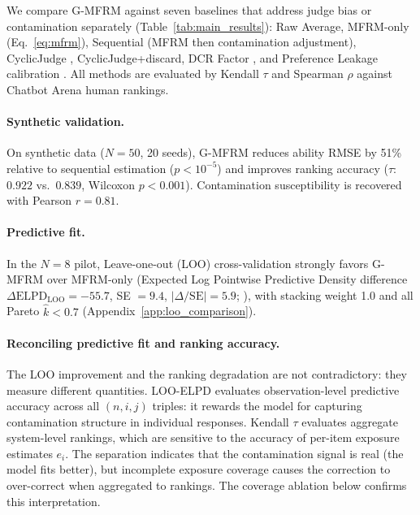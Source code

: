 We compare G-MFRM against seven baselines that address judge bias or contamination separately (Table~\ref{tab:main_results}): Raw Average, MFRM-only (Eq.~\ref{eq:mfrm}), Sequential (MFRM then contamination adjustment), CyclicJudge \citep{cyclicjudge2026}, CyclicJudge+discard, DCR Factor \citep{dcr2025}, and Preference Leakage calibration \citep{preference_leakage2026}. All methods are evaluated by Kendall $\tau$ and Spearman $\rho$ against Chatbot Arena human rankings.

\paragraph{Synthetic validation.} On synthetic data ($N = 50$, 20 seeds), G-MFRM reduces ability RMSE by 51\% relative to sequential estimation ($p < 10^{-5}$) and improves ranking accuracy ($\tau$: $0.922$ vs.\ $0.839$, Wilcoxon $p < 0.001$). Contamination susceptibility is recovered with Pearson $r = 0.81$.

\paragraph{Predictive fit.} In the $N = 8$ pilot, Leave-one-out (LOO) cross-validation strongly favors G-MFRM over MFRM-only (Expected Log Pointwise Predictive Density difference $\Delta\mathrm{ELPD}_{\mathrm{LOO}} = -55.7$, SE $= 9.4$, $|\Delta/\mathrm{SE}| = 5.9$; \citealp{vehtari2017loo}), with stacking weight 1.0 and all Pareto $\hat{k} < 0.7$ (Appendix~\ref{app:loo_comparison}).

\paragraph{Reconciling predictive fit and ranking accuracy.} The LOO improvement and the ranking degradation are not contradictory: they measure different quantities. LOO-ELPD evaluates observation-level predictive accuracy across all $(n, i, j)$ triples: it rewards the model for capturing contamination structure in individual responses. Kendall $\tau$ evaluates aggregate system-level rankings, which are sensitive to the accuracy of per-item exposure estimates $e_i$. The separation indicates that the contamination signal is real (the model fits better), but incomplete exposure coverage causes the correction to over-correct when aggregated to rankings. The coverage ablation below confirms this interpretation.


